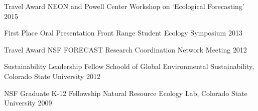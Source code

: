 


\begin{cvhonors}

  \cvhonor
    {Travel Award} %
    {NEON and Powell Center Workshop on `Ecological Forecasting'} %
    {\phantom} %
    {2015} %

  \cvhonor
    {First Place Oral Presentation} %
    {Front Range Student Ecology Symposium} %
    {\phantom} %
    {2013} %

  \cvhonor
    {Travel Award} %
    {NSF FORECAST Research Coordination Network Meeting} %
    {\phantom} %
    {2012} %

  \cvhonor
    {Sustainability Leadership Fellow} %
    {Schoold of Global Environmental Sustainability, Colorado State University} %
    {\phantom} %
    {2012} %

\cvhonor
    {NSF Graduate K-12 Fellowship} %
    {Natural Resource Ecology Lab, Colorado State University} %
    {\phantom} %
    {2009} %

\end{cvhonors}
